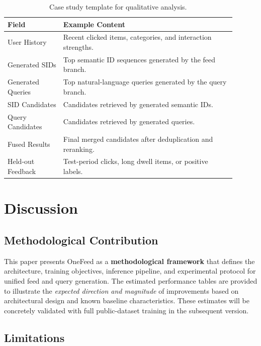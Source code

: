 \documentclass[11pt]{article}
\begin{document}
\begin{table}[t]
\centering
\caption{Case study template for qualitative analysis.}
\label{tab:case_study}
\begin{tabular}{p{0.22\linewidth}p{0.68\linewidth}}
\toprule
Field & Example Content \\
\midrule
User History & Recent clicked items, categories, and interaction strengths. \\
Generated SIDs & Top semantic ID sequences generated by the feed branch. \\
Generated Queries & Top natural-language queries generated by the query branch. \\
SID Candidates & Candidates retrieved by generated semantic IDs. \\
Query Candidates & Candidates retrieved by generated queries. \\
Fused Results & Final merged candidates after deduplication and reranking. \\
Held-out Feedback & Test-period clicks, long dwell items, or positive labels. \\
\bottomrule
\end{tabular}
\end{table}


\section{Discussion}

\subsection{Methodological Contribution}

This paper presents OneFeed as a \textbf{methodological framework} that defines the architecture, training objectives, inference pipeline, and experimental protocol for unified feed and query generation. The estimated performance tables are provided to illustrate the \emph{expected direction and magnitude} of improvements based on architectural design and known baseline characteristics. These estimates will be concretely validated with full public-dataset training in the subsequent version.

\subsection{Limitations}
\end{document}
